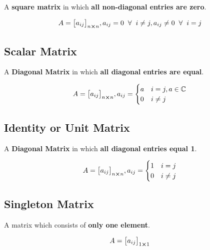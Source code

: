 \documentclass{article}
\begin{document}
A \textbf{square matrix} in which \textbf{all non-diagonal entries are zero}.

$$A={\begin{bmatrix}
        a_{ij}
    \end{bmatrix}}_{n \cross n}, a_{ij}=0 \hspace{2mm} \forall \hspace{2mm} i \not= j, a_{ij} \not= 0 \hspace{2mm} \forall \hspace{2mm} i=j$$

\subsection{Scalar Matrix}

A \textbf{Diagonal Matrix} in which \textbf{all diagonal entries are equal}.

$$A={\begin{bmatrix}
        a_{ij}
    \end{bmatrix}}_{n \cross n}, a_{ij} = \begin{cases}
        a & i=j, a \in \mathbb{C} \\
        0 & i \not= j
    \end{cases} $$

\subsection{Identity or Unit Matrix}

A \textbf{Diagonal Matrix} in which \textbf{all diagonal entries equal 1}.

$$A={\begin{bmatrix}
        a_{ij}
    \end{bmatrix}}_{n \cross n}, a_{ij}=\begin{cases}
        1 & i=j       \\
        0 & i \not= j
    \end{cases} $$

\subsection{Singleton Matrix}

A matrix which consists of \textbf{only one element}.

$$A={\begin{bmatrix}
        a_{ij}
    \end{bmatrix}}_{1 \cross 1} $$
\end{document}
